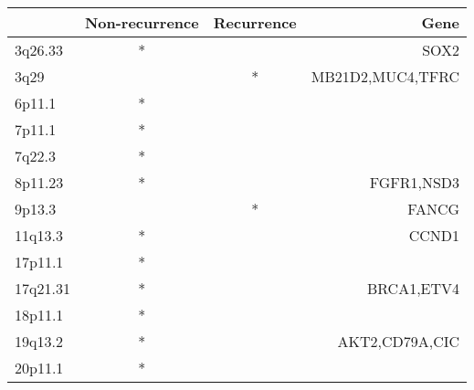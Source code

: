 \begin{tabular}{lccr}
\toprule
{} & Non-recurrence & Recurrence &              Gene \\
\midrule
3q26.33  &              * &            &              SOX2 \\
3q29     &                &          * &  MB21D2,MUC4,TFRC \\
6p11.1   &              * &            &                   \\
7p11.1   &              * &            &                   \\
7q22.3   &              * &            &                   \\
8p11.23  &              * &            &        FGFR1,NSD3 \\
9p13.3   &                &          * &             FANCG \\
11q13.3  &              * &            &             CCND1 \\
17p11.1  &              * &            &                   \\
17q21.31 &              * &            &        BRCA1,ETV4 \\
18p11.1  &              * &            &                   \\
19q13.2  &              * &            &    AKT2,CD79A,CIC \\
20p11.1  &              * &            &                   \\
\bottomrule
\end{tabular}
